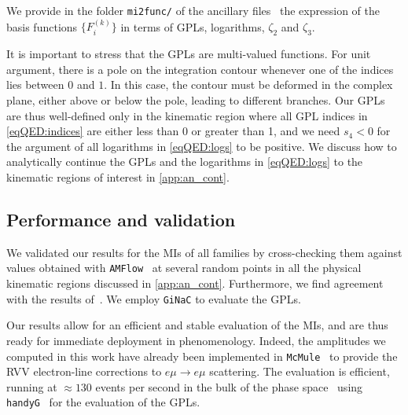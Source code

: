 \documentclass[main.tex]{subfiles}
\begin{document}
We provide in the folder \texttt{mi2func/} of the ancillary files~\cite{zenodo} the expression of the basis functions $\{F^{(k)}_i\}$ in terms of GPLs, logarithms, $\zeta_2$ and $\zeta_3$.

It is important to stress that the GPLs are multi-valued functions.
For unit argument, there is a pole on the integration contour whenever one of the indices lies between $0$ and $1$. In this case, the contour must be deformed in the complex plane, either above or below the pole, leading to different branches. Our GPLs are thus well-defined only in the 
kinematic region where all GPL indices in \cref{eqQED:indices} are either less than 0 or greater than 1, and we need $s_4 < 0$ for the argument of all logarithms in \cref{eqQED:logs} to be positive. We discuss how to analytically continue the GPLs and the logarithms in \cref{eqQED:logs} to the kinematic regions of interest in \cref{app:an_cont}.

\subsection{Performance and validation}
\label{secQED:performance}

We validated our results for the MIs of all families by cross-checking them against values obtained with \texttt{AMFlow}~\cite{Liu:2022chg} at several random points in all the physical kinematic regions discussed in \cref{app:an_cont}. Furthermore, we find agreement with the results of~. We employ \texttt{GiNaC} to evaluate the GPLs.

Our results allow for an efficient and stable evaluation of the MIs, and are thus ready for immediate deployment in phenomenology. Indeed, the amplitudes we computed in this work have already been implemented in \texttt{McMule}~\cite{Banerjee:2020rww,ulrich_yannick_2022_6046769} to provide the \acl{RVV} electron-line corrections to $e \mu \to e \mu$ scattering. The evaluation is efficient, running at $\approx 130$ events per second in the bulk of the phase space~\cite{ulrich-radcor} using \texttt{handyG}~\cite{Naterop:2019xaf} for the evaluation of the GPLs.
\end{document}
